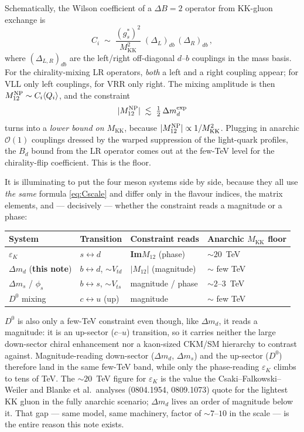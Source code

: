 \documentclass[11pt]{article}
\newcommand{\MKK}{M_{\mathrm{KK}}}
\newcommand{\Mtwelve}{M_{12}}
\newcommand{\dmd}{\Delta m_d}
\newcommand{\epsK}{\varepsilon_K}
\theoremstyle{definition}
\begin{document}
Schematically, the Wilson coefficient of a $\Delta B=2$ operator from KK-gluon
exchange is
\begin{equation}
C_i \;\sim\; \frac{(g_s^*)^2}{\MKK^2}\; (\Delta_L)_{db}\,(\Delta_R)_{db}\,,
\label{eq:Cscale}
\end{equation}
where $(\Delta_{L,R})_{db}$ are the left/right off-diagonal $d$--$b$ couplings in
the mass basis. For the chirality-mixing LR operators, \emph{both} a left and a
right coupling appear; for VLL only left couplings, for VRR only right. The
mixing amplitude is then $\Mtwelve^{\rm NP}\sim C_i\langle Q_i\rangle$, and the
constraint
\begin{equation}
|\Mtwelve^{\rm NP}| \;\lesssim\; \tfrac12\,\dmd^{\rm exp}
\label{eq:floorcondition}
\end{equation}
turns into a \emph{lower bound on $\MKK$}, because $|\Mtwelve^{\rm NP}|\propto
1/\MKK^2$. Plugging in anarchic $\mathcal{O}(1)$ couplings dressed by the warped
suppression of the light-quark profiles, the $B_d$ bound from the LR operator
comes out at the few-TeV level for the chirality-flip coefficient. This is the
floor.

It is illuminating to put the four meson systems side by side, because they all
use \emph{the same} formula \eqref{eq:Cscale} and differ only in the flavour
indices, the matrix elements, and --- decisively --- whether the constraint reads
a magnitude or a phase:
\begin{center}
\begin{tabular}{llll}
\toprule
System & Transition & Constraint reads & Anarchic $\MKK$ floor \\
\midrule
$\epsK$ & $s\!\leftrightarrow\! d$ & \textbf{Im}$\Mtwelve$ (phase) & $\sim 20$~TeV \\
$\dmd$ (\textbf{this note}) & $b\!\leftrightarrow\! d$, $\sim V_{td}$ & $|\Mtwelve|$ (magnitude) & $\sim$ few TeV \\
$\Delta m_s$ / $\phi_s$ & $b\!\leftrightarrow\! s$, $\sim V_{ts}$ & magnitude / phase & $\sim 2$--$3$~TeV \\
$D^0$ mixing & $c\!\leftrightarrow\! u$ (up) & magnitude & $\sim$ few TeV \\
\bottomrule
\end{tabular}
\end{center}
\noindent $D^0$ is also only a few-TeV constraint even though, like $\dmd$, it
reads a magnitude: it is an up-sector ($c$--$u$) transition, so it carries neither
the large down-sector chiral enhancement nor a kaon-sized CKM/SM hierarchy to
contrast against. Magnitude-reading down-sector ($\dmd$, $\Delta m_s$) and the
up-sector ($D^0$) therefore land in the same few-TeV band, while only the
phase-reading $\epsK$ climbs to tens of TeV.
The $\sim20$~TeV figure for $\epsK$ is the value the Csaki--Falkowski--Weiler and
Blanke et al.\ analyses (0804.1954, 0809.1073) quote for the lightest KK gluon in
the fully anarchic scenario; $\dmd$ lives an order of magnitude below it. That
gap --- same model, same machinery, factor of $\sim$$7$--$10$ in the scale --- is
the entire reason this note exists.
\end{document}
